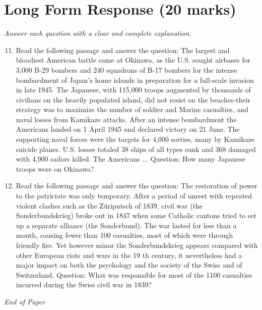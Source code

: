 \documentclass[12pt]{article}
\begin{document}
\section*{Long Form Response (20 marks)}
\textit{Answer each question with a clear and complete explanation.}
\begin{enumerate}[label=\arabic*.]
\setcounter{enumi}{10}
\item Read the following passage and answer the question: The largest and bloodiest American battle came at Okinawa, as the U.S. sought airbases for 3,000 B-29 bombers and 240 squadrons of B-17 bombers for the intense bombardment of Japan's home islands in preparation for a full-scale invasion in late 1945. The Japanese, with 115,000 troops augmented by thousands of civilians on the heavily populated island, did not resist on the beaches-their strategy was to maximize the number of soldier and Marine casualties, and naval losses from Kamikaze attacks. After an intense bombardment the Americans landed on 1 April 1945 and declared victory on 21 June. The supporting naval forces were the targets for 4,000 sorties, many by Kamikaze suicide planes. U.S. losses totaled 38 ships of all types sunk and 368 damaged with 4,900 sailors killed. The Americans ... Question: How many Japanese troops were on Okinawa?
\item Read the following passage and answer the question: The restoration of power to the patriciate was only temporary. After a period of unrest with repeated violent clashes such as the Züriputsch of 1839, civil war (the Sonderbundskrieg) broke out in 1847 when some Catholic cantons tried to set up a separate alliance (the Sonderbund). The war lasted for less than a month, causing fewer than 100 casualties, most of which were through friendly fire. Yet however minor the Sonderbundskrieg appears compared with other European riots and wars in the 19 th century, it nevertheless had a major impact on both the psychology and the society of the Swiss and of Switzerland. Question: What was responsible for most of the 1100 casualties incurred during the Swiss civil war in 1839?
\end{enumerate}

\vfill
\noindent\textit{End of Paper}
\end{document}
